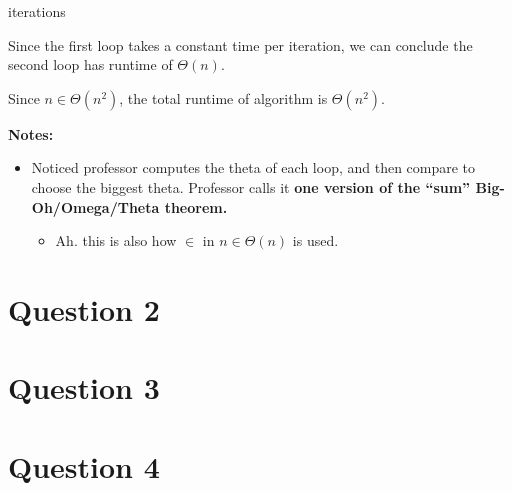 \documentclass[12pt]{article}
\begin{document}
\begin{enumerate}[a.]
\begin{mdframed}
        iterations

        \bigskip

        \color{red}
        Since the first loop takes a constant time per iteration, we can conclude
        the second loop has runtime of $\Theta(n)$.
        \color{black}

        \bigskip

        \color{red}
        Since $n \in \Theta(n^2)$, the total runtime of algorithm is $\Theta(n^2)$.
        \color{black}

    \end{mdframed}

    \bigskip

    \textbf{Notes:}

    \begin{itemize}
        \item Noticed professor computes the theta of each loop, and then compare
        to choose the biggest theta. Professor calls it \textbf{one version of
        the “sum” Big-Oh/Omega/Theta theorem.}

        \begin{itemize}
            \item Ah. this is also how $\in$ in $n \in \Theta(n)$ is used.
        \end{itemize}

    \end{itemize}

\end{enumerate}

\section*{Question 2}

\section*{Question 3}

\section*{Question 4}
\end{document}
